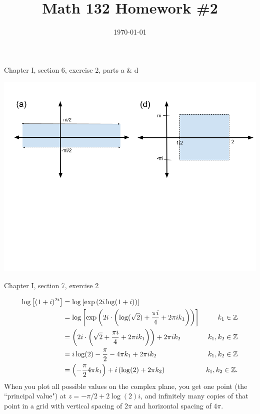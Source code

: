 \documentclass{article}
\date{\today}
\title{Math 132 Homework \#2}
\begin{document}
\maketitle

\begin{prob}
    Chapter I, section 6, exercise 2, parts a \& d
\end{prob}
\begin{center}
    \includegraphics[width=\textwidth]{HW2 prob 1.png}
\end{center}


\bigskip
\par
\begin{prob}
    Chapter I, section 7, exercise 2
\end{prob}
\begin{align*}
    \log \left[ (1+i)^{2i} \right] &= \log \left[ \exp \left( 2i \log(1+i) \right) \right] \\
                                   &= \log \left[ \exp \left( 2i \cdot \left( \log(\sqrt{2}) + \frac{\pi i}{4} + 2\pi i k_1 \right) \right) \right] & k_1 \in \mathbb{Z} \\
                                   &= \left( 2i \cdot \left( \sqrt{2} + \frac{\pi i}{4} + 2\pi i k_1 \right) \right) +2\pi i k_2 & k_1, k_2 \in \mathbb{Z} \\
                                   &= i \log(2) - \frac{\pi}{2} - 4\pi k_1 + 2\pi i k_2 & k_1, k_2 \in \mathbb{Z} \\
                                   &= \left( - \frac{\pi}{2} 4\pi k_1 \right)  +i \left( \log(2)  + 2\pi k_2 \right)  & k_1, k_2 \in \mathbb{Z}.
\end{align*}
When you plot all possible values on the complex plane, you get one point (the ``principal value") at $z = -\pi/2 + 2 \log(2) i$, and infinitely many copies of that point in a grid with vertical spacing of $2 \pi$ and horizontal spacing of $4 \pi$.
\end{document}
